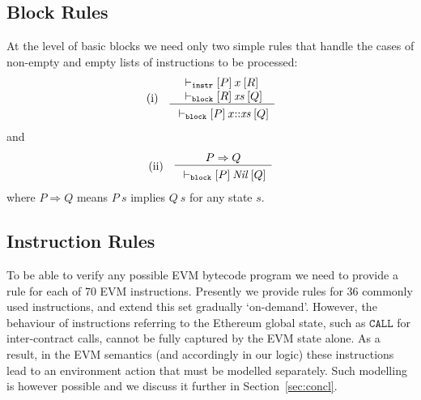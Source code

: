 \documentclass[sigplan,10pt]{acmart}\settopmatter{printfolios=true,printccs=false,printacmref=false}
\newcommand{\subpred}{\Rightarrow}
\newcommand{\ttrip}[5]{\mathit{#1} \vdash_{\mathrm{#2}}[#3]\:#4\:[#5]}
\newcommand{\instr}[1]{\mathtt{#1}}
\newcommand{\RuleC}[2]{\begin{array}{c}#1\\\hline\noalign{\smallskip}#2\end{array}}
\begin{document}
\subsection{Block Rules}
\label{sec:block-rules}
At the level of basic blocks we need only two simple rules
that handle the cases of non-empty and empty lists of instructions
to be processed:
\[
\begin{array}{l l}
\mbox{(i)} & \RuleC{\begin{array}{l}\ttrip{}{\mathtt{instr}}{P}{x}{R} \\
                    \ttrip{}{\mathtt{block}}{R}{\mathit{xs}}{Q}
                    \end{array}}
                   {\ttrip{}{\mathtt{block}}{P}{x\mbox{::}\mathit{xs}}{Q}}
\end{array}
\]
and
\[
\begin{array}{l l}
\mbox{(ii)} & \RuleC{P \subpred Q} 
{\ttrip{}{\mathtt{block}}{P}{\mathit{Nil}}{Q}}
\end{array}
\]
where $P \subpred Q$ means $P\:s$ implies $Q\:s$ for any state $s$.
%
\subsection{Instruction Rules}
\label{sec:instr-rules}
To be able to verify any possible EVM bytecode program we need to provide a rule for 
each of 70 EVM instructions.
Presently we provide rules for 36 commonly used instructions,
and extend this set gradually `on-demand'.
However, the behaviour of instructions referring to the Ethereum global state, 
such as $\instr{CALL}$ for inter-contract calls, cannot be fully captured
by the EVM state alone.
As a result, in the EVM semantics (and accordingly in our logic) these
instructions lead to an environment action that must be modelled separately.
Such modelling is however possible and we discuss it further in Section~\ref{sec:concl}.
\end{document}

